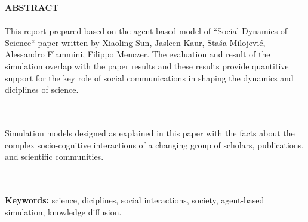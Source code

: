 \begin{center}
\thispagestyle{empty}
\vspace{2cm}
\LARGE{\textbf{ABSTRACT}}\\[1.0cm]
\end{center}
\thispagestyle{empty}
\large{\paragraph{}This report prepared based on the agent-based model of ``Social Dynamics of Science`` paper written by Xiaoling Sun, Jasleen Kaur, Sta\v{s}a Milojevi\'{c}, Alessandro Flammini, Filippo Menczer. The evaluation and result of the simulation overlap with the paper results and these results provide quantitive support for the key role of social communications in shaping the dynamics and diciplines of science.}\\
\large{\paragraph{}Simulation models designed as explained in this paper with the facts about the complex socio-cognitive interactions of a changing group of scholars, publications, and scientiﬁc communities.}
\\\\\textbf{Keywords: }science, diciplines, social interactions, society, agent-based simulation, knowledge diffusion.